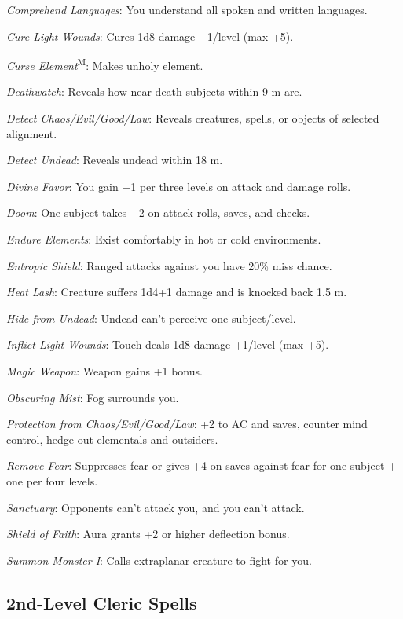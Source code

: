 \textit{Comprehend Languages}: You understand all spoken and written languages.

\textit{Cure Light Wounds}: Cures 1d8 damage +1/level (max +5).

\textit{Curse Element}\textsuperscript{M}: Makes unholy element.

\textit{Deathwatch}: Reveals how near death subjects within 9 m are.

\textit{Detect Chaos/Evil/Good/Law}: Reveals creatures, spells, or objects of selected alignment.

\textit{Detect Undead}: Reveals undead within 18 m.

\textit{Divine Favor}: You gain +1 per three levels on attack and damage rolls.

\textit{Doom}: One subject takes $-2$ on attack rolls, saves, and checks.

\textit{Endure Elements}: Exist comfortably in hot or cold environments.

\textit{Entropic Shield}: Ranged attacks against you have 20\% miss chance.

\textit{Heat Lash}: Creature suffers 1d4+1 damage and is knocked back 1.5 m.

\textit{Hide from Undead}: Undead can't perceive one subject/level.

\textit{Inflict Light Wounds}: Touch deals 1d8 damage +1/level (max +5).


\textit{Magic Weapon}: Weapon gains +1 bonus.

\textit{Obscuring Mist}: Fog surrounds you.

\textit{Protection from Chaos/Evil/Good/Law}: +2 to AC and saves, counter mind control, hedge out elementals and outsiders.

\textit{Remove Fear}: Suppresses fear or gives +4 on saves against fear for one subject + one per four levels.

\textit{Sanctuary}: Opponents can't attack you, and you can't attack.

\textit{Shield of Faith}: Aura grants +2 or higher deflection bonus.

\textit{Summon Monster I}: Calls extraplanar creature to fight for you.



\subsection{2nd-Level Cleric Spells}

